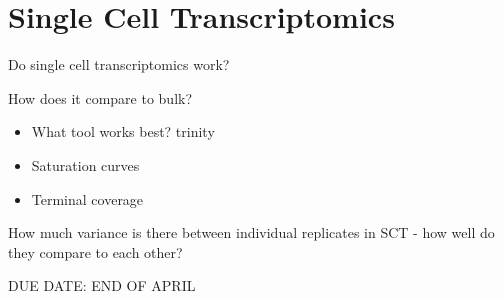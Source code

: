 \graphicspath{{chapters/5.Chapter_3/figures}}

\chapter{Single Cell Transcriptomics}

Do single cell transcriptomics work?

How does it compare to bulk? 
\begin{itemize}
    \item What tool works best? trinity
    \item Saturation curves
    \item Terminal coverage
\end{itemize}

How much variance is there between individual replicates in SCT - how well do they compare to each other?

DUE DATE: END OF APRIL

